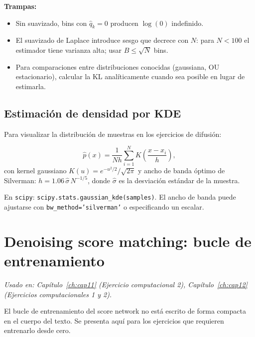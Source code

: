 \noindent\textbf{Trampas:}
\begin{itemize}
  \item Sin suavizado, bins con $\hat{q}_k = 0$ producen $\log(0)$ indefinido.
  \item El suavizado de Laplace introduce sesgo que decrece con $N$: para
        $N < 100$ el estimador tiene varianza alta; usar $B \leq \sqrt{N}$ bins.
  \item Para comparaciones entre distribuciones conocidas (gaussiana, OU
        estacionario), calcular la KL analíticamente cuando sea posible en
        lugar de estimarla.
\end{itemize}

\subsection{Estimación de densidad por KDE}
\label{subsec:ap_kde}

Para visualizar la distribución de muestras en los ejercicios de difusión:

\[
  \hat{p}(x) = \frac{1}{Nh}\sum_{i=1}^N K\!\left(\frac{x-x_i}{h}\right),
\]
con kernel gaussiano $K(u) = e^{-u^2/2}/\sqrt{2\pi}$ y ancho de banda óptimo
de Silverman: $h = 1.06\,\hat\sigma\,N^{-1/5}$, donde $\hat\sigma$ es la
desviación estándar de la muestra.

\noindent En \texttt{scipy}: \texttt{scipy.stats.gaussian\_kde(samples)}.
El ancho de banda puede ajustarse con \texttt{bw\_method='silverman'} o
especificando un escalar.

\section{Denoising score matching: bucle de entrenamiento}
\label{sec:ap_dsm}

\textit{Usado en: Capítulo~\ref{ch:cap11} (Ejercicio computacional 2),
Capítulo~\ref{ch:cap12} (Ejercicios computacionales 1 y 2).}

\medskip
El bucle de entrenamiento del score network no está escrito de forma compacta
en el cuerpo del texto. Se presenta aquí para los ejercicios que requieren
entrenarlo desde cero.


